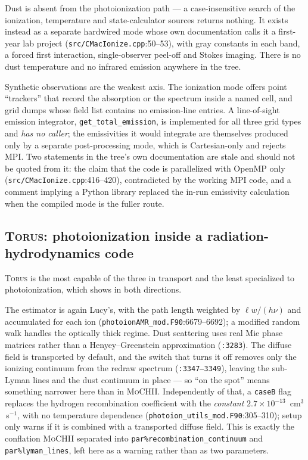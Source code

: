 \documentclass[english,a4paper]{my_memo}
\newcommand{\code}[1]{\texttt{#1}}
\newcommand{\MoCHII}{\textsc{MoCHII}}
\newcommand{\Torus}{\textsc{Torus}}
\begin{document}
Dust is absent from the photoionization path --- a case-insensitive search of
the ionization, temperature and state-calculator sources returns nothing.  It
exists instead as a separate hardwired mode whose own documentation calls it
a first-year lab project (\code{src/CMacIonize.cpp}:50--53), with gray
constants in each band, a forced first interaction, single-observer peel-off
and Stokes imaging.  There is no dust temperature and no infrared emission
anywhere in the tree.

Synthetic observations are the weakest axis.  The ionization mode offers
point ``trackers'' that record the absorption or the spectrum inside a named
cell, and grid dumps whose field list contains no emission-line entries.  A
line-of-sight emission integrator, \code{get\_total\_emission}, is
implemented for all three grid types and \emph{has no caller}; the
emissivities it would integrate are themselves produced only by a separate
post-processing mode, which is Cartesian-only and rejects MPI.  Two
statements in the tree's own documentation are stale and should not be quoted
from it: the claim that the code is parallelized with OpenMP only
(\code{src/CMacIonize.cpp}:416--420), contradicted by the working MPI code,
and a comment implying a Python library replaced the in-run emissivity
calculation when the compiled mode is the fuller route.

\subsection{\Torus{}: photoionization inside a radiation-hydrodynamics code}

\Torus{} is the most capable of the three in transport and the least
specialized to photoionization, which shows in both directions.

The estimator is again Lucy's, with the path length weighted by
$\ell w/(h\nu)$ and accumulated for each ion
(\code{photoionAMR\_mod.F90}:6679--6692); a modified random walk handles the
optically thick regime.  Dust scattering uses real Mie phase matrices rather
than a Henyey--Greenstein approximation (\code{:3283}).  The diffuse field is
transported by default, and the switch that turns it off removes only the
ionizing continuum from the redraw spectrum (\code{:3347--3349}), leaving the
sub-Lyman lines and the dust continuum in place --- so ``on the spot'' means
something narrower here than in \MoCHII{}.  Independently of that, a
\code{caseB} flag replaces the hydrogen recombination coefficient with the
\emph{constant} $2.7\times10^{-13}$~cm$^3$\,s$^{-1}$, with no temperature
dependence (\code{photoion\_utils\_mod.F90}:305--310); setup only warns if it
is combined with a transported diffuse field.  This is exactly the conflation
\MoCHII{} separated into \code{par\%recombination\_continuum} and
\code{par\%lyman\_lines}, left
here as a warning rather than as two parameters.
\end{document}
